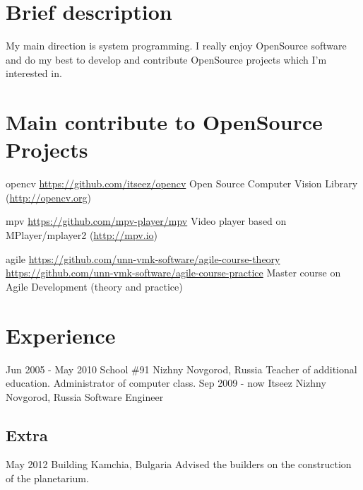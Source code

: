 \documentclass[11pt,a4paper]{moderncv}
\begin{document}
\maketitle
\section{Brief description}
\cvline
  {}
  {My main direction is system programming.\newline{}
  I really enjoy OpenSource software and do my best to develop and contribute OpenSource projects which I'm interested in.}

\section{Main contribute to OpenSource Projects}
\cvline
  {opencv}
  {\url{https://github.com/itseez/opencv}\newline{}
  Open Source Computer Vision Library (\url{http://opencv.org})}

\cvline
  {mpv}
  {\url{https://github.com/mpv-player/mpv}\newline{}
  Video player based on MPlayer/mplayer2 (\url{http://mpv.io})}

\cvline
  {agile}
  {
  \url{https://github.com/unn-vmk-software/agile-course-theory}\newline{}
  \url{https://github.com/unn-vmk-software/agile-course-practice}\newline{}
  Master course on Agile Development (theory and practice)
  }

  
\section{Experience}
\cventry
  {Jun 2005 - May 2010}
  {School \#91}
  {Nizhny Novgorod, Russia}
  {}{}
  {Teacher of additional education. Administrator of computer class.}
\cventry
  {Sep 2009 - now}
  {Itseez}
  {Nizhny Novgorod, Russia}
  {}{}
  {Software Engineer}

\subsection{Extra}
\cventry
  {May 2012}
  {Building}
  {Kamchia, Bulgaria}
  {}{}
  {Advised the builders on the construction of the planetarium.}
  
\end{document}

